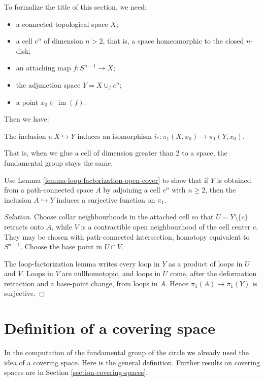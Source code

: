 To formalize the title of this section, we
need:
\begin{itemize}
\item a connected topological space $X$;
\item a cell $e^n$ of dimension $n>2$, that
is, a space
homeomorphic to the closed $n$-disk;
\item an attaching map $f:S^{n-1}\to X$;
\item the adjunction space $Y=X\cup_f e^n$;
\item a point $x_0\in\operatorname{im}(f)$.
\end{itemize}
Then we have:

\begin{theorem}
The inclusion $i:X\hookrightarrow Y$ induces
an isomorphism
$i_*:\pi_1(X,x_0)\to\pi_1(Y,x_0)$.
\end{theorem}

That is, when we glue a cell of dimension
greater than 2 to
a space, the fundamental group stays the
same.




\begin{exercise}
Use Lemma
\ref{lemma-loop-factorization-open-cover} to
show that if $Y$ is obtained from a
path-connected space $A$ by adjoining a cell
$e^n$ with $n\geq2$, then the inclusion
$A\hookrightarrow Y$
induces a surjective function on $\pi_1$.
\end{exercise}

\begin{proof}[Solution]
Choose collar neighbourhoods in the attached
cell so that $U=Y\setminus\{c\}$ retracts
onto
$A$, while $V$ is a contractible open
neighbourhood of the cell center $c$. They
may
be chosen with path-connected intersection,
homotopy equivalent to $S^{n-1}$. Choose the
base point in $U\cap V$.

The loop-factorization lemma writes every
loop
in $Y$ as a product of loops in $U$ and $V$.
Loops in $V$ are nullhomotopic, and loops in
$U$ come, after the deformation retraction
and
a base-point change, from loops in $A$. Hence
$\pi_1(A)\to\pi_1(Y)$ is surjective.
\end{proof}
\section{Definition of a covering space}
\label{section-covering-space-definition}

In the computation of the fundamental group
of the circle we already used the idea of a
covering space. Here is the general
definition. Further results on covering
spaces are in
Section \ref{section-covering-spaces}.

